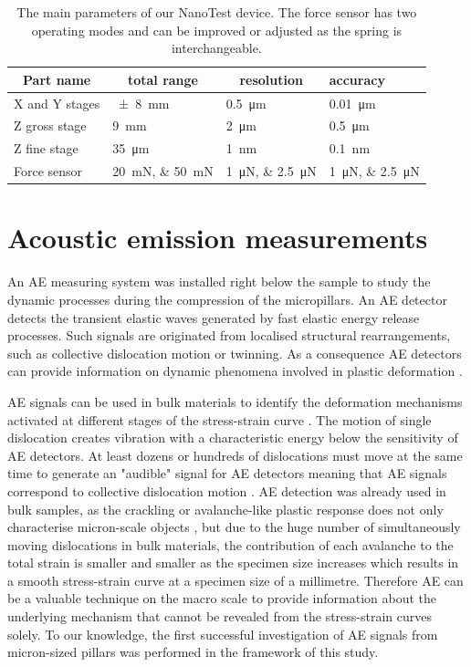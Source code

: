 \begin{table}[htbp]
\centering
\caption[NanoTest parameters]{The main parameters of our NanoTest device. The force sensor has two operating modes and can be improved or adjusted as the spring is interchangeable.}
\label{table:nanotest_paramters}
\begin{tabular}{llll}
\hline
\multicolumn{1}{c}{Part name} & \multicolumn{1}{c}{total range} & \multicolumn{1}{c}{resolution} & accuracy \\ \hline
X and Y stages  & \SI{\pm8}{mm}         & \SI{0.5}{\micro\meter} & \SI{0.01}{\micro\meter} \\
Z gross stage   & \SI{9}{mm}            & \SI{2}{\micro\meter}   & \SI{0.5}{\micro\meter}  \\
Z fine stage    & \SI{35}{\micro\meter} & \SI{1}{\nano\meter}    & \SI{0.1}{\nano\meter}   \\
Force sensor    & \SIlist{20;50}{mN}   & \SIlist{1;2.5}{\micro\newton} & \SIlist{1;2.5}{\micro\newton}   \\ \hline
\end{tabular}
\end{table}

\section{Acoustic emission measurements}
An AE measuring system was installed right below the sample to study the dynamic processes during the compression of the micropillars. An AE detector detects the transient elastic waves generated by fast elastic energy release processes. Such signals are originated from localised structural rearrangements, such as collective dislocation motion or twinning. As a consequence AE detectors can provide information on dynamic phenomena involved in plastic deformation \cite{heiple1987acoustic}.

AE signals can be used in bulk materials to identify the deformation mechanisms activated at different stages of the stress-strain curve \cite{BOHLEN2004214,PhysRevB.76.224110,dobrovn2009acoustic,KOVACS2014113}. The motion of single dislocation creates vibration with a characteristic energy below the sensitivity of AE detectors. At least dozens or hundreds of dislocations must move at the same time to generate an "audible" signal for AE detectors meaning that AE signals correspond to collective dislocation motion \cite{doi:10.1179/msc.1981.15.11-12.599}. AE detection was already used in bulk samples, as the crackling or avalanche-like plastic response does not only characterise micron-scale objects \cite{PhysRevB.76.224110}, but due to the huge number of simultaneously moving dislocations in bulk materials, the contribution of each avalanche to the total strain is smaller and smaller as the specimen size increases which results in a smooth stress-strain curve at a specimen size of a millimetre. Therefore AE can be a valuable technique on the macro scale to provide information about the underlying mechanism that cannot be revealed from the stress-strain curves solely. To our knowledge, the first successful investigation of AE signals from micron-sized pillars was performed in the framework of this study.

